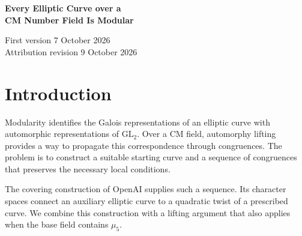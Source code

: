 \documentclass[11pt,a4paper]{article}
\numberwithin{equation}{section}
\begin{document}
\thispagestyle{plain}
\begin{center}
{\LARGE\bfseries Every Elliptic Curve over a\\[3pt]
CM Number Field Is Modular\par}
\vspace{12pt}
{\small First version 7 October 2026\\[2pt]Attribution revision 9 October 2026\par}
\end{center}
\vspace{5pt}


\begin{abstract}
We prove that every elliptic curve over a CM number field is modular. The proof combines the covering construction of OpenAI with a mod-5 automorphy lifting argument that retains a residually ramified Steinberg place. Following a method of Taylor and Khare--Thorne, the local condition at this place excludes the exceptional cohomology classes for \(\mathrm{SL}_2(\mathbb F_5)\). Partial framing then supplies Taylor--Wiles presentations with the required dimension, while integral local--global compatibility imposes the same Steinberg condition on the Hecke-valued representations. A specialization of the covering family produces a modular auxiliary elliptic curve and three congruences, in characteristics \(p\), \(3\), and \(p\), connecting it to the original curve. The construction works over non-Galois CM fields and includes fields containing fifth roots of unity.
\end{abstract}

\section{Introduction}

Modularity identifies the Galois representations of an elliptic curve with automorphic representations of \(\mathrm{GL}_2\). Over a CM field, automorphy lifting provides a way to propagate this correspondence through congruences. The problem is to construct a suitable starting curve and a sequence of congruences that preserves the necessary local conditions.

The covering construction of OpenAI \cite{O} supplies such a sequence. Its character spaces connect an auxiliary elliptic curve to a quadratic twist of a prescribed curve. We combine this construction with a lifting argument that also applies when the base field contains \(\mu_5\).
\end{document}
